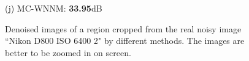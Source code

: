 \documentclass[10pt,onecolumn,letterpaper]{article}
\begin{document}
\begin{figure}[!htbp]
{\begin{minipage}[t]{0.25\textwidth}
{\footnotesize (j) MC-WNNM: \textbf{33.95}dB}
\end{minipage}
}
\caption{Denoised images of a region cropped from the real noisy image ``Nikon D800 ISO 6400 2" \cite{crosschannel2016} by different methods. The images are better to be zoomed in on screen.}
\label{f14}
\end{figure}




\clearpage
{
\small


}
\end{document}
